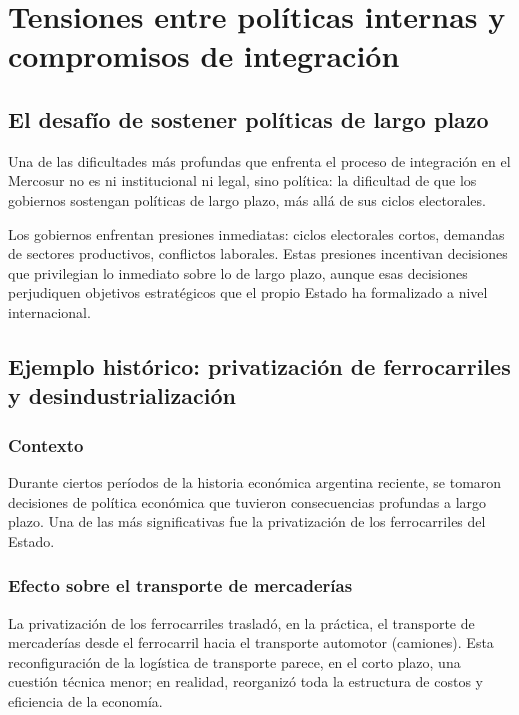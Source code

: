 \documentclass[12pt,oneside]{book}
\begin{document}
\chapter{Tensiones entre políticas internas y compromisos de integración}

\section{El desafío de sostener políticas de largo plazo}

Una de las dificultades más profundas que enfrenta el proceso de integración en el Mercosur no es ni institucional ni legal, sino política: la dificultad de que los gobiernos sostengan políticas de largo plazo, más allá de sus ciclos electorales.

Los gobiernos enfrentan presiones inmediatas: ciclos electorales cortos, demandas de sectores productivos, conflictos laborales. Estas presiones incentivan decisiones que privilegian lo inmediato sobre lo de largo plazo, aunque esas decisiones perjudiquen objetivos estratégicos que el propio Estado ha formalizado a nivel internacional.

\section{Ejemplo histórico: privatización de ferrocarriles y desindustrialización}

\subsection{Contexto}

Durante ciertos períodos de la historia económica argentina reciente, se tomaron decisiones de política económica que tuvieron consecuencias profundas a largo plazo. Una de las más significativas fue la privatización de los ferrocarriles del Estado.

\subsection{Efecto sobre el transporte de mercaderías}

La privatización de los ferrocarriles trasladó, en la práctica, el transporte de mercaderías desde el ferrocarril hacia el transporte automotor (camiones). Esta reconfiguración de la logística de transporte parece, en el corto plazo, una cuestión técnica menor; en realidad, reorganizó toda la estructura de costos y eficiencia de la economía.
\end{document}
